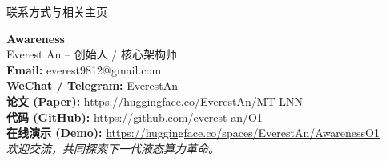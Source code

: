 ﻿\documentclass[aspectratio=169, 10pt]{beamer}
\begin{document}
\begin{frame}{联系方式与相关主页}
\begin{center}
    \LARGE \textbf{Awareness} \\
    \vspace{0.5em}
    \large Everest An -- 创始人 / 核心架构师 \\
    \vspace{1.5em}
    \normalsize
    \textbf{Email:} everest9812@gmail.com \\
    \textbf{WeChat / Telegram:} EverestAn \\
    \vspace{1.5em}
    \small
    \textbf{论文 (Paper):} \url{https://huggingface.co/EverestAn/MT-LNN} \\
    \textbf{代码 (GitHub):} \url{https://github.com/everest-an/O1} \\
    \textbf{在线演示 (Demo):} \url{https://huggingface.co/spaces/EverestAn/AwarenessO1} \\
    \vspace{1.5em}
    \textit{欢迎交流，共同探索下一代液态算力革命。}
\end{center}
\end{frame}
\end{document}
